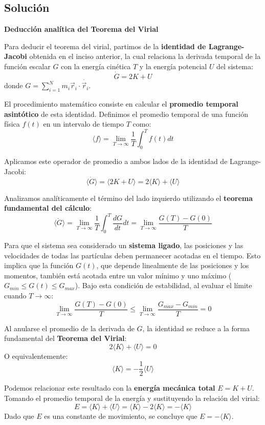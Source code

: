 \documentclass[12pt, letterpaper]{article}
\begin{document}
\subsection{Solución}

\textbf{Deducción analítica del Teorema del Virial}

Para deducir el teorema del virial, partimos de la \textbf{identidad de Lagrange-Jacobi} obtenida en el inciso anterior, la cual relaciona la derivada temporal de la función escalar $G$ con la energía cinética $T$ y la energía potencial $U$ del sistema:
$$ \dot{G} = 2K + U $$
donde $G = \sum_{i=1}^N m_i \vec{r}_i \cdot \dot{\vec{r}_i}$.

El procedimiento matemático consiste en calcular el \textbf{promedio temporal asintótico} de esta identidad. Definimos el promedio temporal de una función física $f(t)$ en un intervalo de tiempo $T$ como:
$$ \langle f \rangle = \lim_{T \to \infty} \frac{1}{T} \int_0^T f(t) dt $$

Aplicamos este operador de promedio a ambos lados de la identidad de Lagrange-Jacobi:
$$ \langle \dot{G} \rangle = \langle 2K + U \rangle = 2\langle K \rangle + \langle U \rangle $$

Analizamos analíticamente el término del lado izquierdo utilizando el \textbf{teorema fundamental del cálculo}:
$$ \langle \dot{G} \rangle = \lim_{T \to \infty} \frac{1}{T} \int_0^T \frac{dG}{dt} dt = \lim_{T \to \infty} \frac{G(T) - G(0)}{T} $$

Para que el sistema sea considerado un \textbf{sistema ligado}, las posiciones y las velocidades de todas las partículas deben permanecer acotadas en el tiempo. Esto implica que la función $G(t)$, que depende linealmente de las posiciones y los momentos, también está acotada entre un valor mínimo y uno máximo ($G_{min} \leq G(t) \leq G_{max}$). Bajo esta condición de estabilidad, al evaluar el límite cuando $T \to \infty$:
$$ \lim_{T \to \infty} \frac{G(T) - G(0)}{T} \leq \lim_{T \to \infty} \frac{G_{max} - G_{min}}{T} = 0 $$

Al anularse el promedio de la derivada de $G$, la identidad se reduce a la forma fundamental del \textbf{Teorema del Virial}:
$$ 2\langle K \rangle + \langle U \rangle = 0 $$
O equivalentemente:
$$ \langle K \rangle = -\frac{1}{2} \langle U \rangle $$

Podemos relacionar este resultado con la \textbf{energía mecánica total} $E = K + U$. Tomando el promedio temporal de la energía y sustituyendo la relación del virial:
$$ E = \langle K \rangle + \langle U \rangle = \langle K \rangle - 2\langle K \rangle = -\langle K \rangle $$
Dado que $E$ es una constante de movimiento, se concluye que $E = -\langle K \rangle$.
\end{document}
